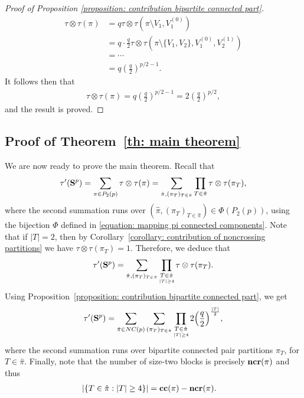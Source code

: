 \documentclass[12pt,reqno]{amsart}
\theoremstyle{plain}
\newcommand{\1}{\mathbf{1}}
\newcommand{\ccblocks}{\operatorname{\bf cc}}
\newcommand{\ncrblocks}{\operatorname{\bf ncr}}
\begin{document}
\begin{proof}[Proof of Proposition \ref{proposition: contribution bipartite connected part}]
\begin{align*}
        \tau\otimes \tau(\pi)&=q\tau\otimes \tau\left(\pi\setminus V_1,V_1^{(0)}\right)\\
        &=q\cdot \frac{q}{2}\tau\otimes \tau\left(\pi\setminus\{V_1,V_2\},V_1^{(0)},V_2^{(1)}\right)\\
        &=\cdots\\
        &=q\left(\frac{q}{2}\right)^{p/2-1}.
    \end{align*}
    It follows then that
    \begin{align*}
        \tau\otimes \tau(\pi)=q\left(\frac{q}{2}\right)^{p/2-1}=2\left(\frac{q}{2}\right)^{p/2},
    \end{align*}
    and the result is proved.
\end{proof}

\subsection{Proof of Theorem~\ref{th: main theorem}}
We are now ready to prove the main theorem. 
Recall that 
\begin{align*}
    \tau'({\bf{S}}^{p})=\sum_{\pi \in P_2(p)}\tau\otimes \tau(\pi)= \sum_{\hat{\pi},(\pi_T)_{T \in \hat{\pi}}}\prod_{T \in \hat{\pi}}\tau\otimes \tau(\pi_T), 
\end{align*}
where the second summation runs over $(\hat{\pi},(\pi_T)_{T \in \hat{\pi}})\in \Phi(P_2(p))$, using the bijection $\Phi$ defined in \eqref{equation: mapping pi connected components}.
Note that if $|T|=2$, then by Corollary~\ref{corollary: contribution of noncrossing partitions} we have $\tau\otimes \tau(\pi_T)=1$. 
Therefore, we deduce that 
\begin{align*}
    \tau'({\bf{S}}^{p})= \sum_{\hat{\pi},(\pi_T)_{T \in \hat{\pi}}} \prod_{\underset{|T|\geq 4}{T \in \hat{\pi}}}\tau\otimes \tau(\pi_T). 
\end{align*}
Using Proposition~\ref{proposition: contribution bipartite connected part}, we get
\begin{align*}
    \tau'({\bf{S}}^{p})= \sum_{\hat{\pi}\in NC(p)}\sum_{(\pi_T)_{T \in \hat{\pi}}}\prod_{\underset{|T|\geq 4}{T \in \hat{\pi}}}2 \Big(\frac{q}{2}\Big)^{\frac{|T|}{2}},
\end{align*} 
where the second summation runs over bipartite connected pair partitions $\pi_T$, for $T \in \hat{\pi}$.
Finally, note that the number of size-two blocks is precisely $\ncrblocks(\pi)$ and thus
\begin{align*}
    &|\{T \in \hat{\pi}:|T| \ge 4\}|=\ccblocks(\pi)-\ncrblocks(\pi).
\end{align*}
\end{document}
